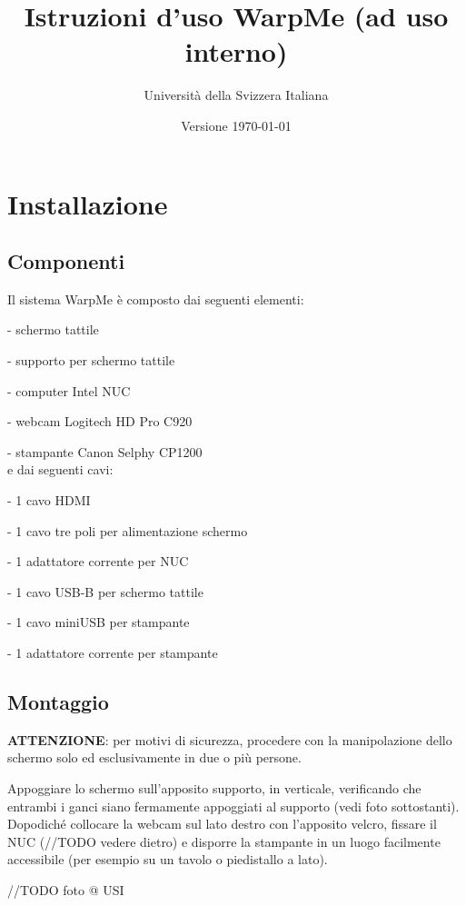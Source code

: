 \documentclass[12pt]{article}
\title{Istruzioni d'uso WarpMe (ad uso interno)}
\author{Università della Svizzera Italiana}
\date{Versione \today}
\begin{document}
\maketitle
\tableofcontents
\newpage


\section{Installazione}\label{installation}	

	\subsection{Componenti}
	
		Il sistema WarpMe è composto dai seguenti elementi:
		
		- schermo tattile
		
		- supporto per schermo tattile
		
		- computer Intel NUC
		
		- webcam Logitech HD Pro C920
		
		- stampante Canon Selphy CP1200\\
		
		e dai seguenti cavi:
		
		- 1 cavo HDMI
		
		- 1 cavo tre poli per alimentazione schermo
		
		- 1 adattatore corrente per NUC
		
		- 1 cavo USB-B per schermo tattile
		
		- 1 cavo miniUSB per stampante
		
		- 1 adattatore corrente per stampante
		
		
	\subsection{Montaggio}
	
		\textbf{ATTENZIONE}: per motivi di sicurezza, procedere con la manipolazione dello schermo solo ed esclusivamente in due o più persone.
		
		Appoggiare lo schermo sull'apposito supporto, in verticale, verificando che entrambi i ganci siano fermamente appoggiati al supporto (vedi foto sottostanti). Dopodiché collocare la webcam sul lato destro con l'apposito velcro, fissare il NUC (//TODO vedere dietro) e disporre la stampante in un luogo facilmente accessibile (per esempio su un tavolo o piedistallo a lato).
	
		//TODO foto @ USI
		
\end{document}
